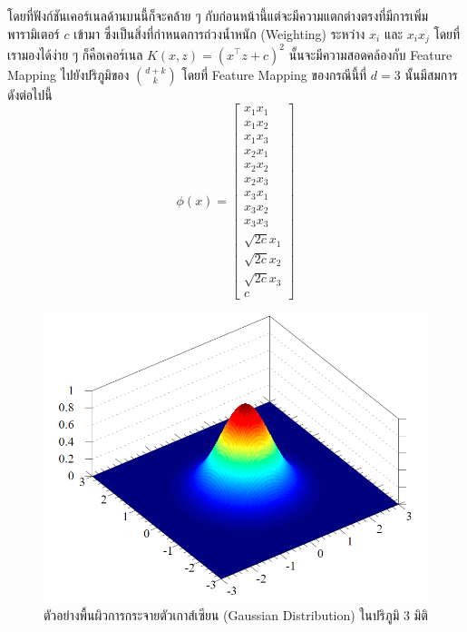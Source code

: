 \noindent โดยที่ฟังก์ชันเคอร์เนลด้านบนนี้ก็จะคล้าย ๆ กับก่อนหน้านี้แต่จะมีความแตกต่างตรงที่มีการเพิ่มพารามิเตอร์ $c$ เข้ามา ซึ่งเป็นสิ่งที่กำหนดการถ่วงน้ำหนัก (Weighting) ระหว่าง $x_{i}$ และ $x_{i}x_{j}$ โดยที่เรามองได้ง่าย ๆ ก็คือเคอร์เนล $K(x,z) = (x^{\top} z + c)^2$ นั้นจะมีความสอดคล้องกับ Feature Mapping ไปยังปริภูมิของ $\binom{d+k}{k}$ โดยที่ Feature Mapping ของกรณีนี้ที่ $d = 3$ นั้นมีสมการดังต่อไปนี้
%
\begin{equation}\label{eq:feature_map_ex2}
    \phi(x) =
    \begin{bmatrix}
        x_1 x_1      \\
        x_1 x_2      \\
        x_1 x_3      \\
        x_2 x_1      \\
        x_2 x_2      \\
        x_2 x_3      \\
        x_3 x_1      \\
        x_3 x_2      \\
        x_3 x_3      \\
        \sqrt{2c}x_1 \\
        \sqrt{2c}x_2 \\
        \sqrt{2c}x_3 \\
        c
    \end{bmatrix}
\end{equation}

\begin{figure}[H]
    \centering
    \includegraphics[width=0.65\linewidth]{fig/gaussian-3d.png}
    \caption{ตัวอย่างพื้นผิวการกระจายตัวเกาส์เซียน (Gaussian Distribution) ในปริภูมิ 3 มิติ}
    \label{fig:gaussian_3d}
\end{figure}

